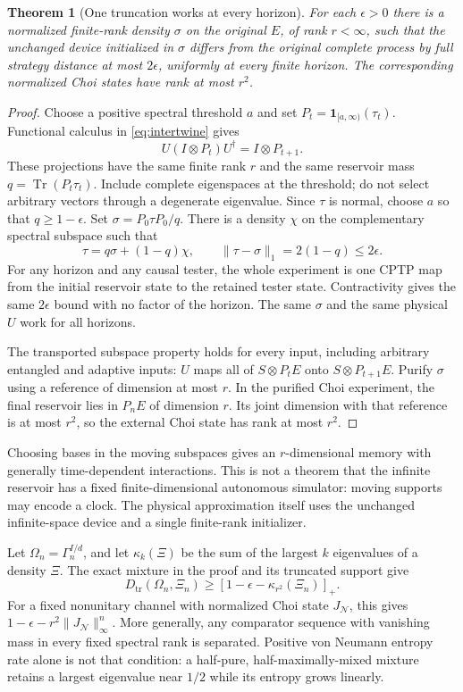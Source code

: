 \documentclass[11pt]{article}
\newtheorem{theorem}{Theorem}[section]
\theoremstyle{definition}\newtheorem{definition}[theorem]{Definition}
\newcommand{\Tr}{\operatorname{Tr}}
\newcommand{\cN}{\mathcal N}
\newcommand{\norm}[1]{\lVert #1\rVert}
\newcommand{\D}{D_{\mathrm{tr}}}
\begin{document}
\begin{theorem}[One truncation works at every horizon]\label{thm:uniform}
For each $\epsilon>0$ there is a normalized finite-rank density $\sigma$ on the original $E$, of rank $r<\infty$, such that the unchanged device initialized in $\sigma$ differs from the original complete process by full strategy distance at most $2\epsilon$, uniformly at every finite horizon. The corresponding normalized Choi states have rank at most $r^2$.
\end{theorem}
\begin{proof}
Choose a positive spectral threshold $a$ and set $P_t=\mathbf1_{[a,\infty)}(\tau_t)$. Functional calculus in \eqref{eq:intertwine} gives
\[
 U(I\otimes P_t)U^\dagger=I\otimes P_{t+1}.
\]
These projections have the same finite rank $r$ and the same reservoir mass $q=\Tr(P_t\tau_t)$. Include complete eigenspaces at the threshold; do not select arbitrary vectors through a degenerate eigenvalue. Since $\tau$ is normal, choose $a$ so that $q\ge1-\epsilon$. Set $\sigma=P_0\tau P_0/q$. There is a density $\chi$ on the complementary spectral subspace such that
\[
 \tau=q\sigma+(1-q)\chi,\qquad \norm{\tau-\sigma}_1=2(1-q)\le2\epsilon.
\]
For any horizon and any causal tester, the whole experiment is one CPTP map from the initial reservoir state to the retained tester state. Contractivity gives the same $2\epsilon$ bound with no factor of the horizon. The same $\sigma$ and the same physical $U$ work for all horizons.

The transported subspace property holds for every input, including arbitrary entangled and adaptive inputs: $U$ maps all of $S\otimes P_tE$ onto $S\otimes P_{t+1}E$. Purify $\sigma$ using a reference of dimension at most $r$. In the purified Choi experiment, the final reservoir lies in $P_nE$ of dimension $r$. Its joint dimension with that reference is at most $r^2$, so the external Choi state has rank at most $r^2$.
\end{proof}

Choosing bases in the moving subspaces gives an $r$-dimensional memory with generally time-dependent interactions. This is not a theorem that the infinite reservoir has a fixed finite-dimensional autonomous simulator: moving supports may encode a clock. The physical approximation itself uses the unchanged infinite-space device and a single finite-rank initializer.

Let $\Omega_n=\Gamma_n^{I/d}$, and let $\kappa_k(\Xi)$ be the sum of the largest $k$ eigenvalues of a density $\Xi$. The exact mixture in the proof and its truncated support give
\begin{equation}
 \D(\Omega_n,\Xi_n)\ge[1-\epsilon-\kappa_{r^2}(\Xi_n)]_+.
 \label{eq:kyfan}
\end{equation}
For a fixed nonunitary channel with normalized Choi state $J_{\cN}$, this gives $1-\epsilon-r^2\norm{J_{\cN}}_\infty^n$. More generally, any comparator sequence with vanishing mass in every fixed spectral rank is separated. Positive von Neumann entropy rate alone is not that condition: a half-pure, half-maximally-mixed mixture retains a largest eigenvalue near $1/2$ while its entropy grows linearly.
\end{document}
